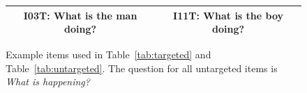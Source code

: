 \documentclass[12pt,notitlepage]{article}
\begin{document}
\begin{figure}[h]
\begin{center}
\begin{tabular}{|c|c|}
\hline
I03T: What is the man doing? & I11T: What is the boy doing? \\
\hline
\end{tabular}
\end{center}
\caption{Example items used in Table~\ref{tab:targeted} and Table~\ref{tab:untargeted}. The question for all untargeted items is \textit{What is happening?}}
\label{fig:appendix1}
\end{figure}

\clearpage 

\end{document}

